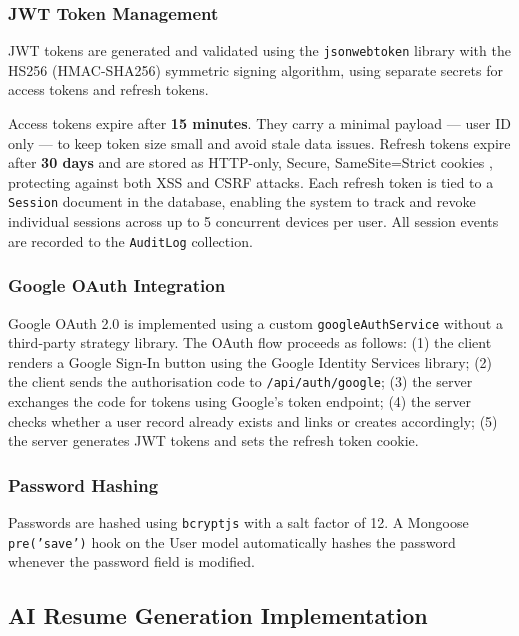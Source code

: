 \documentclass[12pt, a4paper, oneside]{report}
\begin{document}
\subsubsection{JWT Token Management}

JWT tokens are generated and validated using the \texttt{jsonwebtoken} library \cite{jwt2015} with the HS256 (HMAC-SHA256) symmetric signing algorithm, using separate secrets for access tokens and refresh tokens.

Access tokens expire after \textbf{15 minutes}. They carry a minimal payload --- user ID only --- to keep token size small and avoid stale data issues. Refresh tokens expire after \textbf{30 days} and are stored as HTTP-only, Secure, SameSite=Strict cookies \cite{owasp2021}, protecting against both XSS and CSRF attacks. Each refresh token is tied to a \texttt{Session} document in the database, enabling the system to track and revoke individual sessions across up to 5 concurrent devices per user. All session events are recorded to the \texttt{AuditLog} collection.

\subsubsection{Google OAuth Integration}

Google OAuth 2.0 \cite{oauth2012} is implemented using a custom \texttt{googleAuthService} without a third-party strategy library. The OAuth flow proceeds as follows: (1) the client renders a Google Sign-In button using the Google Identity Services library; (2) the client sends the authorisation code to \texttt{/api/auth/google}; (3) the server exchanges the code for tokens using Google's token endpoint; (4) the server checks whether a user record already exists and links or creates accordingly; (5) the server generates JWT tokens \cite{jwt2015} and sets the refresh token cookie.

\subsubsection{Password Hashing}

Passwords are hashed using \texttt{bcryptjs} \cite{bcrypt1999} with a salt factor of 12. A Mongoose \cite{mongoose2024} \texttt{pre('save')} hook on the User model automatically hashes the password whenever the password field is modified.

\subsection{AI Resume Generation Implementation}
\end{document}
